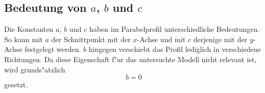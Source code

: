 \subsection{Bedeutung von \texorpdfstring{$a$}{a}, \texorpdfstring{$b$}{b} und 
\texorpdfstring{$c$}{c}}

Die Konstanten $a$, $b$ und $c$ haben im Parabelprofil unterschiedliche 
Bedeutungen. So kann mit $a$ der Schnittpunkt mit der $x$-Achse 
und mit $c$ derjenige mit der $y$-Achse festgelegt werden. $b$ hingegen 
verschiebt das Profil lediglich in verschiedene Richtungen. Da diese 
Eigenschaft f"ur das untersuchte Modell nicht relevant ist, wird grunds"atzlich
\begin{equation*}
	b = 0
\end{equation*}
gesetzt.